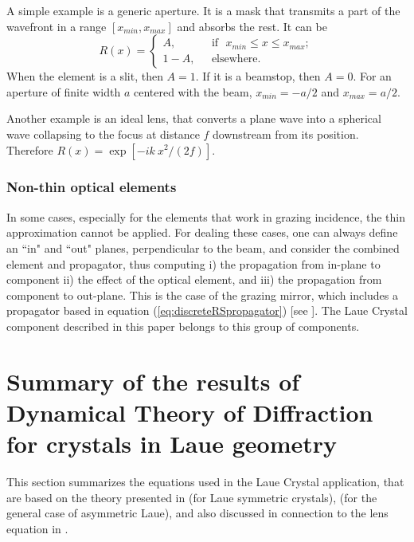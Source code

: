 \documentclass[preprint]{iucr}              %
\begin{document}
A simple example is a generic aperture. It is a mask that transmits a part of the wavefront in a range $[x_{min},x_{max}]$ and absorbs the rest. It can be
\begin{equation}
R(x) =
\left\{
\begin{matrix}
A,  & \mbox{~~if~~} x_{min} \le x \le x_{max};
\\ 
1 - A, & \mbox{~~elsewhere}.
\end{matrix}
\right.
\end{equation}
When the element is a slit, then $A=1$. If it is a beamstop, then $A=0$. For an aperture of finite width $a$ centered with the beam, $x_{min}=-a/2$ and $x_{max}=a/2$.
 
Another example is an ideal lens, that converts a plane wave into a spherical wave collapsing to the focus at distance $f$ downstream from its position.
Therefore $R(x) = \exp[-i k~x^2/(2 f)]$.

\subsubsection{Non-thin optical elements}
\label{sec:nonthinelements}
In some cases, especially for the elements that work in grazing incidence, the thin approximation cannot be applied.
For dealing these cases, one can always define an ``in" and ``out" planes, perpendicular to the beam, and consider the combined element and propagator, thus computing i) the propagation from in-plane to component ii) the effect of the optical element, and iii) the propagation from component to out-plane.
This is the case of the grazing mirror, which includes a propagator based in equation (\ref{eq:discreteRSpropagator}) [see \cite{WOFRYoptics, SanchezdelRio2020}].
The Laue Crystal component described in this paper belongs to this group of components.  

%
\section{Summary of the results of Dynamical Theory of Diffraction for crystals in Laue geometry}
\label{sec:theory}

This section summarizes the equations used in the Laue Crystal application, that are based on the theory presented in \cite{GuigayFerrero2013} (for Laue symmetric crystals), \cite{GuigayFerrero2016} (for the general case of asymmetric Laue), and also discussed in connection to the lens equation in \cite{guigaySanchezdelrio2024}.
\end{document}
